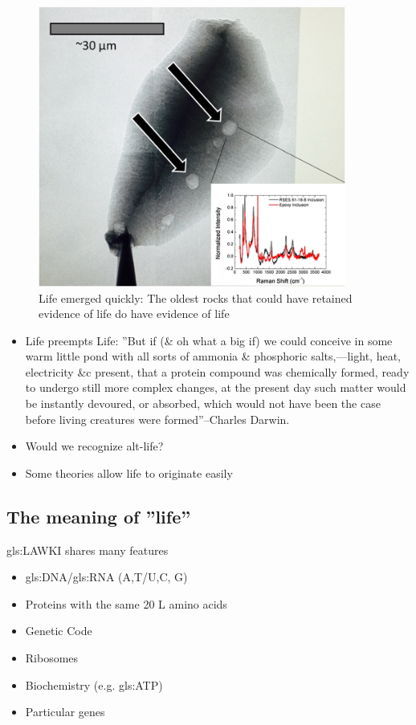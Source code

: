 \documentclass[]{article}
\begin{document}
\begin{figure}[H]
	\caption{Life emerged quickly: The oldest rocks that could have retained evidence of life do have evidence of life\cite{bell2015potentially}}\label{fig:zircons} 
	\includegraphics[width=0.9\textwidth]{Zircons}
\end{figure}

\begin{itemize}
	\item Life preempts Life: ''But if (\& oh what a big if) we could conceive in some warm little pond with all sorts of ammonia \& phosphoric salts,—light, heat, electricity \&c present, that a protein compound was chemically formed, ready to undergo still more complex changes, at the present day such matter would be instantly devoured, or absorbed, which would not have been the case before living creatures were formed''--Charles Darwin\cite{darwin1871letter}.
	
	\item Would we recognize alt-life?
	
	\item Some theories allow life to originate easily\cite{wachtershauser1988before}
\end{itemize}

\subsection{The meaning of ''life''}
\gls{gls:LAWKI} shares many features
\begin{itemize}
	\item \gls{gls:DNA}/\gls{gls:RNA} (A,T/U,C, G)
	\item Proteins with the same 20 L amino acids
	\item Genetic Code
	\item Ribosomes
	\item Biochemistry (e.g. \gls{gls:ATP})
	\item Particular genes
\end{itemize}
\end{document}
